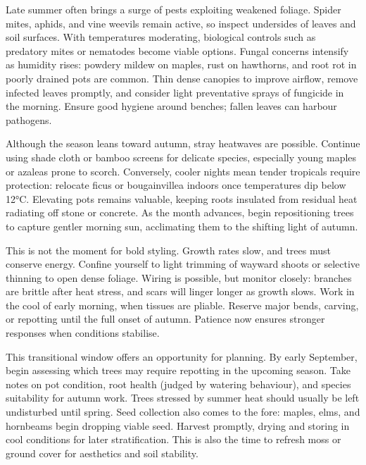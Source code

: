 \medskip  
{}  
\noindent  
Late summer often brings a surge of pests exploiting weakened foliage. 
Spider mites, aphids, and vine weevils remain active, so inspect undersides of leaves and soil surfaces. 
With temperatures moderating, biological controls such as predatory mites or nematodes become viable options.
Fungal concerns intensify as humidity rises: powdery mildew on maples, rust on hawthorns, and root rot in poorly drained pots are common. 
Thin dense canopies to improve airflow, remove infected leaves promptly, and consider light preventative sprays of fungicide in the morning. 
Ensure good hygiene around benches; fallen leaves can harbour pathogens.  

\medskip  
{}  
\noindent  
Although the season leans toward autumn, stray heatwaves are possible. 
Continue using shade cloth or bamboo screens for delicate species, especially young maples or azaleas prone to scorch. 
Conversely, cooler nights mean tender tropicals require protection: relocate ficus or bougainvillea indoors once temperatures dip below 12°C.
Elevating pots remains valuable, keeping roots insulated from residual heat radiating off stone or concrete. 
As the month advances, begin repositioning trees to capture gentler morning sun, acclimating them to the shifting light of autumn.  

\medskip  
{}  
\noindent  
This is not the moment for bold styling. 
Growth rates slow, and trees must conserve energy. 
Confine yourself to light trimming of wayward shoots or selective thinning to open dense foliage. 
Wiring is possible, but monitor closely: branches are brittle after heat stress, and scars will linger longer as growth slows. 
Work in the cool of early morning, when tissues are pliable.
Reserve major bends, carving, or repotting until the full onset of autumn. 
Patience now ensures stronger responses when conditions stabilise.  

\medskip  
{}  
\noindent  
This transitional window offers an opportunity for planning. 
By early September, begin assessing which trees may require repotting in the upcoming season. 
Take notes on pot condition, root health (judged by watering behaviour), and species suitability for autumn work. 
Trees stressed by summer heat should usually be left undisturbed until spring.
Seed collection also comes to the fore: maples, elms, and hornbeams begin dropping viable seed. 
Harvest promptly, drying and storing in cool conditions for later stratification. 
This is also the time to refresh moss or ground cover for aesthetics and soil stability.  

